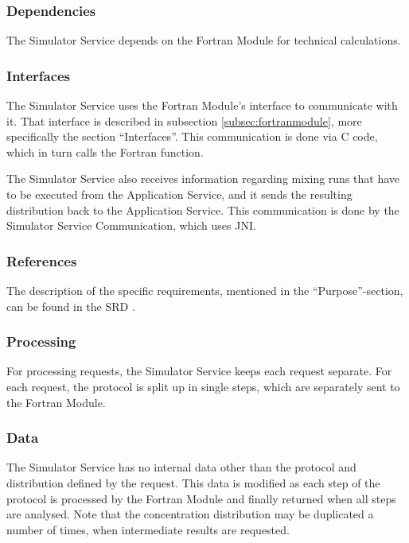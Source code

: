 \subsubsection*{Dependencies}
The Simulator Service depends on the Fortran Module for technical calculations.

\subsubsection*{Interfaces}
The Simulator Service uses the Fortran Module's interface to communicate with it. That interface is described in subsection \ref{subsec:fortranmodule}, more specifically the section ``Interfaces''. This communication is done via C code, which in turn calls the Fortran function.

The Simulator Service also receives information regarding mixing runs that have to be executed from the Application Service, and it sends the resulting distribution back to the Application Service. This communication is done by the Simulator Service Communication, which uses JNI.

\subsubsection*{References}
The description of the specific requirements, mentioned in the ``Purpose''-section, can be found in the SRD \cite{srd}.

\subsubsection*{Processing}
For processing requests, the Simulator Service keeps each request separate. For each request, the protocol is split up in single steps, which are separately sent to the Fortran Module.

\subsubsection*{Data}
The Simulator Service has no internal data other than the protocol and distribution defined by the request. This data is modified as each step of the protocol is processed by the Fortran Module and finally returned when all steps are analysed. Note that the concentration distribution may be duplicated a number of times, when intermediate results are requested.

